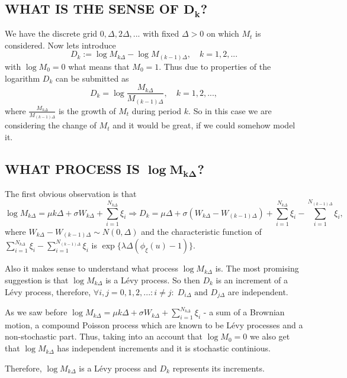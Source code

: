 \subsection{WHAT IS THE SENSE OF $\boldsymbol{D_{k}}$?}
 
 We have the discrete grid $0, \Delta, 2\Delta, ...  $ with fixed $\Delta > 0$ on which $M_{t}$ is considered.
 Now lets introduce
 \[D_{k} := \log M_{k \Delta} - \log M_{(k - 1) \Delta}, \quad k = 1, 2, ... \]
 with $\log M_{0} = 0$ what means that $M_{0} = 1$. Thus due to properties of the logarithm $D_{k}$ can be submitted as \[D_{k} = \log \frac{M_{k \Delta}} {M_{(k - 1) \Delta}}, \quad k = 1, 2, ...,\] where $\frac {M_{k \Delta}} {M_{(k - 1) \Delta}}$ is the growth of $M_{t}$ during period $k$. So in this case we are considering the change of $M_{t}$ and it would be great, if we could somehow model it.
 
\subsection{WHAT PROCESS IS $\boldsymbol{\log{M_{k \Delta}}}$?}
 
The first obvious observation is that \[\log M_{k \Delta} = \mu k \Delta + \sigma W_{k \Delta} + \sum \limits_{i=1}^{N_{k \Delta}} \xi_{i} \Rightarrow D_{k} = \mu \Delta + \sigma (W_{k \Delta} - W_{(k - 1) \Delta})  + \sum \limits_{i=1}^{N_{k \Delta}} \xi_{i} - \sum \limits_{i=1}^{N_{(k - 1) \Delta}} \xi_{i},\] where $W_{k \Delta} - W_{(k - 1) \Delta} \sim N(0, \Delta)$ and the characteristic function of $\sum \limits_{i=1}^{N_{k \Delta}} \xi_{i} - \sum \limits_{i=1}^{N_{(k - 1) \Delta}} \xi_{i}$ is $\exp\{  \lambda \Delta (\phi_{\xi}(u) - 1) \}$.
 
Also it makes sense to understand what process $\log{M_{k \Delta}}$ is. The most promising suggestion is that $\log M_{k \Delta}$ is a L\'evy process. So then $D_{k}$ is an increment of a L\'evy process, therefore, $\forall i, j = 0, 1, 2, ... : i \neq j: \;  D_{i \Delta} \text{ and } D_{j \Delta}$ are independent.

As we saw before $\log M_{k \Delta} = \mu k \Delta + \sigma W_{k \Delta} + \sum \limits_{i=1}^{N_{k \Delta}} \xi_{i}$ - a sum of a Brownian motion, a compound Poisson process which are known to be L\'evy processes and a non-stochastic part. Thus, taking into an account that $\log M_{0} = 0$ we also get that $\log M_{k \Delta}$ has independent increments and it is stochastic continious.

Therefore, $\log M_{k \Delta}$ is a L\'evy process and $D_{k}$ represents its increments.


